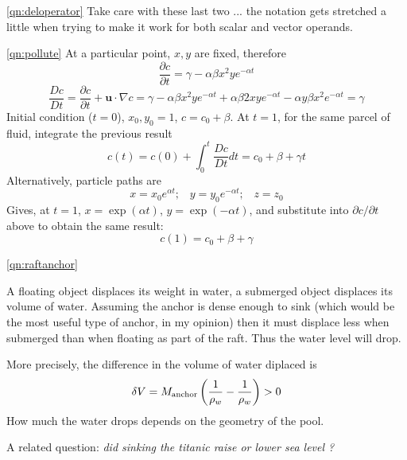 \documentclass[10pt]{report}
\begin{document}
\begin{answer2}
\begin{questionnumber}{\ref{qn:deloperator}}
Take care with these last two ... the notation gets stretched a little when trying to make it work for both scalar and vector operands.
\end{questionnumber}

\begin{questionnumber}{\ref{qn:pollute}}
At a particular point, $x,y$ are fixed, therefore
\[
     \frac{\partial c}{\partial t} = \gamma - \alpha \beta x^{2}y e^{-\alpha t}
\]
\[
\frac{Dc}{Dt} = \frac{\partial c}{\partial t} + {\bm u}\cdot \nabla c =
	\gamma - \alpha \beta x^{2}y e^{-\alpha t} +
             \alpha \beta 2 x y   e^{-\alpha t} - \alpha y \beta x^{2} e^{-\alpha t} =
    \gamma
\]
Initial condition ($t=0$), $x_{0},y_{0} = 1$, $c = c_{0} + \beta$.
At $t=1$, for the same parcel of fluid, integrate the previous result
\[
   c(t) = c(0) + \int_{0}^{t}\frac{Dc}{Dt} dt = c_{0} + \beta + \gamma t
\]
Alternatively, particle paths are
\[
x = x_{0} e^{\alpha t}; \;\;\; y = y_{0} e^{-\alpha t}; \;\;\; z = z_{0}
\]
Gives, at $t=1$, $x=\exp(\alpha t)$, $y=\exp(-\alpha t)$, and substitute into $\partial c / \partial t$ above
to obtain the same result:
\[
   c(1) = c_{0} + \beta + \gamma
\]

\end{questionnumber}



\begin{questionnumber}{\ref{qn:raftanchor}}

A floating object displaces its weight in water, a submerged object displaces its volume of
water. Assuming the anchor is dense enough to sink (which would be the most useful type of anchor, in
my opinion) then it must displace less when submerged than when floating as part of the raft. Thus the
water level will drop.

More precisely, the difference in the volume of water diplaced is
\[
 \delta V = M_{{\rm anchor}} \left( \frac{1}{\rho_{w}} - \frac{1}{\rho_{w}} \right) > 0
\]
How much the water drops depends on the geometry of the pool.

A related question: \textit{did sinking the titanic raise or lower sea level ?}
\end{questionnumber}


\end{answer2}
\end{document}
